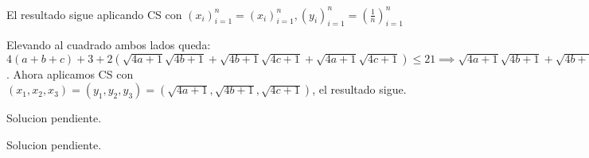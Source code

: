 \begin{sol}
	El resultado sigue aplicando CS con $(x_{i})_{i=1}^{n} = (x_{i})_{i=1}^{n}, (y_{i})_{i=1}^{n} = (\frac{1}{n})_{i=1}^{n}$
\end{sol}

\begin{sol}
	Elevando al cuadrado ambos lados queda: $4(a+b+c) + 3 + 2(\sqrt{4a+1}\sqrt{4b+1}+\sqrt{4b+1}\sqrt{4c+1}+\sqrt{4a+1}\sqrt{4c+1}) \leq 21 \implies \sqrt{4a+1}\sqrt{4b+1}+\sqrt{4b+1}\sqrt{4c+1}+\sqrt{4a+1}\sqrt{4c+1} \leq 7$. Ahora aplicamos CS con $(x_{1}, x_{2}, x_{3}) = (y_{1}, y_{2}, y_{3}) = (\sqrt{4a+1}, \sqrt{4b+1}, \sqrt{4c+1})$, el resultado sigue.
\end{sol}

\begin{sol}
	Solucion pendiente.
\end{sol}

\begin{sol}
	Solucion pendiente.
\end{sol}